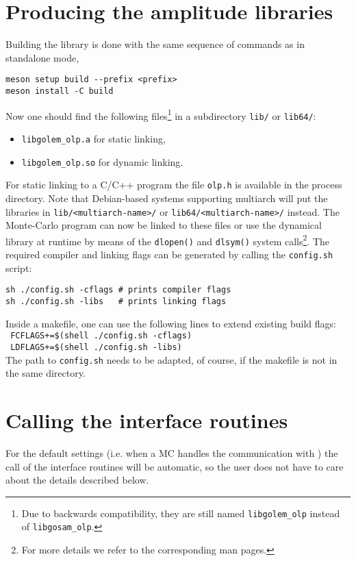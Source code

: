 %
%
%
%

\section{Producing the amplitude libraries}\label{sec:BLHA_compiling}
Building the library is done with the same sequence of commands as in standalone mode,
\begin{lstlisting}[style=sh]
meson setup build --prefix <prefix> 
meson install -C build
\end{lstlisting}
Now one should find the following files\footnote{Due to backwards compatibility, they are still named \texttt{libgolem\_olp} instead of \texttt{libgosam\_olp}.} in a subdirectory \texttt{lib/} or \texttt{lib64/}:
\begin{itemize}
\item \texttt{libgolem\_olp.a} for static linking,
\item \texttt{libgolem\_olp.so} for dynamic linking.
\end{itemize}
For static linking to a C/C++ program the file \texttt{olp.h} is available in the process directory. Note that Debian-based systems supporting multiarch will put the libraries in \texttt{lib/<multiarch-name>/} or \texttt{lib64/<multiarch-name>/} instead. The Monte-Carlo program can now be linked to these files or use the dynamical library at runtime by means of the \texttt{dlopen()} and \texttt{dlsym()} system calls\footnote{For more details we refer to the corresponding man pages.}. The required compiler and linking flags can be generated by calling the \texttt{config.sh} script:
\begin{lstlisting}[style=sh]
sh ./config.sh -cflags # prints compiler flags 
sh ./config.sh -libs   # prints linking flags
\end{lstlisting}
Inside a makefile, one can use the following lines to extend existing build flags:\\[5pt]
\texttt{ FCFLAGS+=\$(shell ./config.sh -cflags)} \\
\texttt{ LDFLAGS+=\$(shell ./config.sh -libs)}\\[5pt]
\noindent The path to \texttt{config.sh} needs to be adapted, of course, if the makefile is not in the same directory.

%
%
%
%

\section{Calling the interface routines}\label{sec:BLHA_calling}
For the default settings (i.e. when a MC handles the communication with \gosam) the call of the interface routines will be automatic, so the user does not have to care about the details described below.

